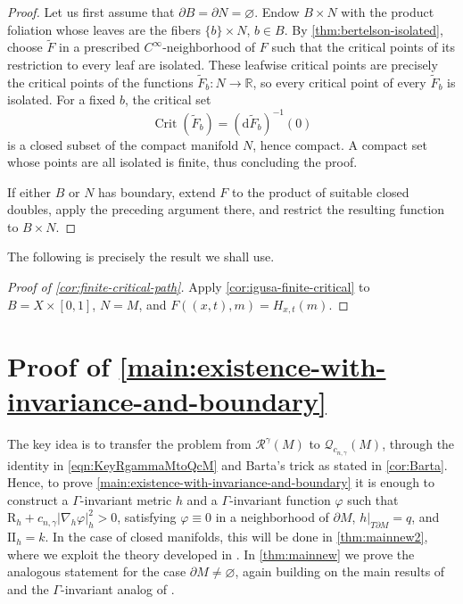 \documentclass[11pt]{amsart}
\numberwithin{equation}{section}
\newcommand{\Riem}{\mathcal{R}}
\newcommand{\scal}{\mathrm{R}}
\DeclareMathOperator{\Crit}{Crit}
\newcommand{\Q}{\mathcal Q}
\begin{document}
\begin{proof}
Let us first assume that $\partial B=\partial N=\varnothing$. Endow $B\times N$ with the product foliation whose leaves are the fibers $\{b\}\times N$, $b\in B$. By 
\cref{thm:bertelson-isolated}, choose $\widetilde F$ in a prescribed
$C^\infty$-neighborhood of $F$ such that the critical points of its restriction to
every leaf are isolated. These leafwise critical points are precisely the
critical points of the functions $\widetilde F_b:N\to\mathbb R$, so every critical point of
every $\widetilde F_b$ is isolated. For a fixed $b$, the critical set
\[
 \Crit(\widetilde F_b)=(\mathrm{d}\widetilde F_b)^{-1}(0)
\]
is a closed subset of the compact manifold $N$, hence compact. A compact set
whose points are all isolated is finite, thus concluding the proof.

If either $B$ or $N$ has boundary, extend $F$ to the product of suitable closed
doubles, apply the preceding argument there, and restrict the resulting
function to $B\times N$.
\end{proof}

The following is precisely the result we shall use.


\begin{proof}[Proof of \cref{cor:finite-critical-path}]
Apply \cref{cor:igusa-finite-critical} to $B=X\times [0,1]$, $N=M$, and $F((x,t),m)=H_{x,t}(m)$.
\end{proof}

\section{Proof of \texorpdfstring{\cref{main:existence-with-invariance-and-boundary}}{Theorem B}}\label{sec:THMB}

The key idea is to transfer the problem from $\Riem^\gamma(M)$ to $\Q_{c_{n,\gamma}}(M)$, through the identity in \eqref{eqn:KeyRgammaMtoQcM} and Barta's trick as stated in \cref{cor:Barta}. 
Hence, to prove \cref{main:existence-with-invariance-and-boundary} it is enough to construct a $\Gamma$-invariant metric $h$ and a $\Gamma$-invariant function $\varphi$ such that $\scal_h+c_{n,\gamma}|\nabla_h \varphi|^2_h>0$, satisfying $\varphi\equiv 0$ in a neighborhood of $\partial M$, $h|_{T\partial M}=q$, and $\mathrm{II}_h=k$.
In the case of closed manifolds, this will be done in \cref{thm:mainnew2}, where we exploit the theory developed in \cite{BaerHankeLocalFlexibility}.
In \cref{thm:mainnew} we prove the analogous statement for the case $\partial M\not=\varnothing$, again building on the main results of \cite{BaerHankeLocalFlexibility} and the $\Gamma$-invariant analog of \cite[Remark 3.2]{BaerHankeBoundaryConditions}.
\end{document}
